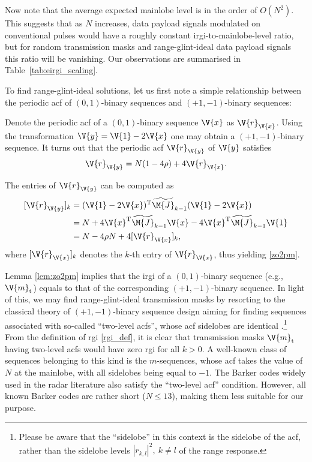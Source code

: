 \documentclass[journal,a4paper,10pt, romanappendices]{IEEEtran}
\begin{document}
Now note that the average expected mainlobe level is in the order of $O(N^2)$. This suggests that as $N$ increases, data payload signals modulated on conventional pulses would have a roughly constant \ac{irgi}-to-mainlobe-level ratio, but for random transmission masks and range-glint-ideal data payload signals this ratio will be vanishing. Our observations are summarised in Table~\ref{tab:eirgi_scaling}.

To find range-glint-ideal solutions, let us first note a simple relationship between the periodic \ac{acf} of $(0,1)$-binary sequences and $(+1,-1)$-binary sequences:
\begin{lemma}\label{lem:zo2pm}
Denote the periodic \ac{acf} of a $(0,1)$-binary sequence $\V{x}$ as $\V{r}_{\V{x}}$. Using the transformation $\V{y} = \V{1}-2\V{x}$ one may obtain a $(+1,-1)$-binary sequence. It turns out that the periodic \ac{acf} $\V{r}_{\V{y}}$ of $\V{y}$ satisfies
\begin{equation}\label{zo2pm}
\V{r}_{\V{y}} = N(1-4\rho) + 4\V{r}_{\V{x}}.
\end{equation}
\begin{IEEEproof}
The entries of $\V{r}_{\V{y}}$ can be computed as
$$
\begin{aligned}
\relax[\V{r}_{\V{y}}]_k &=(\V{1}-2\V{x})^{\rm T}\widetilde{\M{J}}_{k-1}(\V{1}-2\V{x})\\
&=N + 4\V{x}^{\rm T}\widetilde{\M{J}}_{k-1} \V{x} - 4 \V{x}^{\rm T}\widetilde{\M{J}}_{k-1}\V{1}\\
&= N - 4 \rho N + 4[\V{r}_{\V{x}}]_k,
\end{aligned}
$$
where $[\V{r}_{\V{x}}]_k$ denotes the $k$-th entry of $\V{r}_{\V{x}}$, thus yielding \eqref{zo2pm}.
\end{IEEEproof}
\end{lemma}

Lemma \ref{lem:zo2pm} implies that the \ac{irgi} of a $(0,1)$-binary sequence (e.g., $\V{m}_{\rm t}$) equals to that of the corresponding $(+1,-1)$-binary sequence. In light of this, we may find range-glint-ideal transmission masks by resorting to the classical theory of $(+1,-1)$-binary sequence design aiming for finding sequences associated with so-called ``two-level \ac{acf}s'', whose \ac{acf} sidelobes are identical \cite{two_level}.\footnote{Please be aware that the ``sidelobe'' in this context is the sidelobe of the \ac{acf}, rather than the sidelobe levels $|r_{k,l}|^2,~k\neq l$ of the range response.} From the definition of \ac{rgi} \eqref{rgi_def}, it is clear that transmission masks $\V{m}_{\rm t}$ having two-level \ac{acf}s would have zero \ac{rgi} for all $k>0$. A well-known class of sequences belonging to this kind is the $m$-sequences, whose \ac{acf} takes the value of $N$ at the mainlobe, with all sidelobes being equal to $-1$. The Barker codes widely used in the radar literature also satisfy the ``two-level \ac{acf}'' condition. However, all known Barker codes are rather short ($N\leq 13$), making them less suitable for our purpose.
\end{document}
